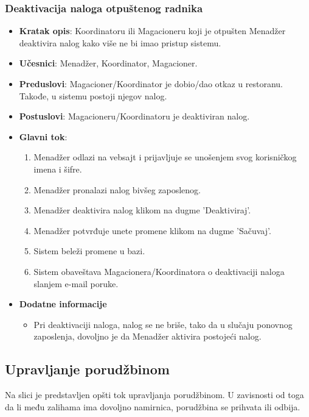  \subsubsection{Deaktivacija naloga otpuštenog radnika}
 \begin{itemize}
    \item \textbf{Kratak opis}:
   Koordinatoru ili Magacioneru koji je otpušten Menadžer deaktivira nalog kako više ne bi imao pristup sistemu.
    \item \textbf{Učesnici}:
    Menadžer, Koordinator, Magacioner.
    \item \textbf{Preduslovi}:
    Magacioner/Koordinator je dobio/dao otkaz u restoranu. Takođe, u sistemu postoji njegov nalog.
    \item \textbf{Postuslovi}:
    Magacioneru/Koordinatoru je deaktiviran nalog. 
    \item \textbf{Glavni tok}:
    \begin{enumerate}
        \item Menadžer odlazi na vebsajt i prijavljuje se unošenjem svog korisničkog imena i šifre.
        \item Menadžer pronalazi nalog bivšeg zaposlenog.
        \item Menadžer deaktivira nalog klikom na dugme 'Deaktiviraj'.
        \item Menadžer potvrđuje unete promene klikom na dugme 'Sačuvaj'.
        \item Sistem beleži promene u bazi.
        \item Sistem obaveštava Magacionera/Koordinatora o deaktivaciji naloga slanjem e-mail poruke.
    \end{enumerate}
\item \textbf{Dodatne informacije}
 \begin{itemize}
     \item Pri deaktivaciji naloga, nalog se ne briše, tako da u slučaju ponovnog zaposlenja, dovoljno je da Menadžer aktivira postojeći nalog.
 \end{itemize}
 \end{itemize}

\subsection{Upravljanje porudžbinom}
Na slici je predstavljen opšti tok upravljanja porudžbinom. U zavisnosti od toga da li među zalihama ima dovoljno namirnica, porudžbina se prihvata ili odbija.

